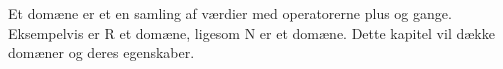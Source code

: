 Et domæne er et en samling af værdier med operatorerne plus og gange.
Eksempelvis er $\mathrm{R}$ et domæne, ligesom $ \mathrm{N}$ er et domæne.
Dette kapitel vil dække domæner og deres egenskaber.



